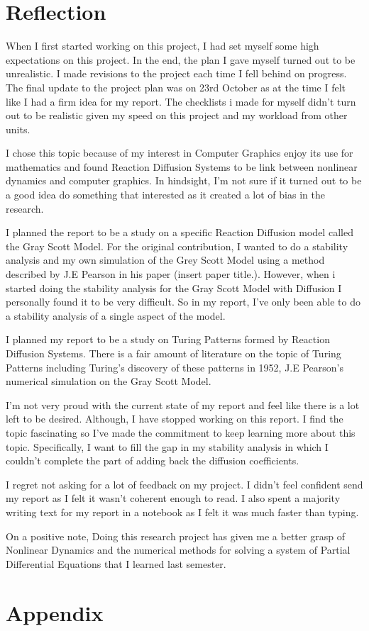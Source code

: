\documentclass[a4paper, 11pt]{article}
\begin{document}
\pagebreak
\section{Reflection}
When I first started working on this project, I had set myself some high expectations on this project. In the end, the plan I gave myself turned out to be unrealistic. I made revisions to the project each time I fell behind on progress. The final update to the project plan was on 23rd October as at the time I felt like I had a firm idea for my report. The checklists i made for myself didn't turn out to be realistic given my speed on this project and my workload from other units. 

I chose this topic because of my interest in Computer Graphics enjoy its use for mathematics and found Reaction Diffusion Systems to be link between nonlinear dynamics and computer graphics. In hindsight, I'm not sure if it turned out to be a good idea do something that interested as it created a lot of bias in the research.   

I planned the report to be a study on a specific Reaction Diffusion model called the Gray Scott Model. For the original contribution, I wanted to do a stability analysis and my own simulation of the Grey Scott Model using a method described by J.E Pearson in his paper (insert paper title.). However, when i started doing the stability analysis for the Gray Scott Model with Diffusion I personally found it to be very difficult. So in my report, I’ve only been able to do a stability analysis of a single aspect of the model. 


I planned my report to be a study on Turing Patterns formed by Reaction Diffusion Systems. There is a fair amount of literature on the topic of Turing Patterns including Turing's discovery of these patterns in 1952, J.E Pearson's numerical simulation on the Gray Scott Model.   


I’m not very proud with the current state of my report and feel like there is a lot left to be desired. Although, I have stopped working on this report. I find the topic fascinating so I've made the commitment to keep learning more about this topic. Specifically, I want to fill the gap in my stability analysis in which I couldn't complete the part of adding back the diffusion coefficients. 

I regret not asking for a lot of feedback on my project. I didn't feel confident send my report as I felt it wasn't coherent enough to read. I also spent a majority writing text for my report in a notebook as I felt it was much faster than typing. 

On a positive note, Doing this research project has given me a better grasp of Nonlinear Dynamics and the numerical methods for solving a system of Partial Differential Equations that I learned last semester. 

\section{Appendix}
\end{document}

